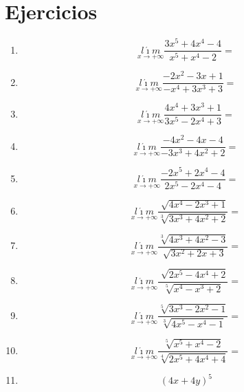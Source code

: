 \documentclass[oneside,spanish,letter]{article}
\begin{document}
\section{Ejercicios}
\begin{enumerate}
 \item $$\underset{x\rightarrow +\infty}{l\acute{\imath}m} \frac{3x^5+4x^4-4}{x^5+x^4-2}=$$
 \item $$\underset{x\rightarrow +\infty}{l\acute{\imath}m} \frac{-2x^2-3x+1}{-x^4+3x^3+3}=$$
 \item $$\underset{x\rightarrow +\infty}{l\acute{\imath}m} \frac{4x^4+3x^3+1}{3x^5-2x^4+3}=$$
 \item $$\underset{x\rightarrow +\infty}{l\acute{\imath}m} \frac{-4x^2-4x-4}{-3x^3+4x^2+2}=$$
 \item $$\underset{x\rightarrow +\infty}{l\acute{\imath}m} \frac{-2x^5+2x^4-4}{2x^5-2x^4-4}=$$
 \item $$\underset{x\rightarrow +\infty}{l\acute{\imath}m} \frac{\sqrt[]{4x^4-2x^3+1}}{\sqrt[3]{3x^3+4x^2+2}}=$$
 \item $$\underset{x\rightarrow +\infty}{l\acute{\imath}m} \frac{\sqrt[3]{4x^3+4x^2-3}}{\sqrt[]{3x^2+2x+3}}=$$
 \item $$\underset{x\rightarrow +\infty}{l\acute{\imath}m} \frac{\sqrt[]{2x^5-4x^4+2}}{\sqrt[5]{x^4-x^3+2}}=$$
 \item $$\underset{x\rightarrow +\infty}{l\acute{\imath}m} \frac{\sqrt[5]{3x^3-2x^2-1}}{\sqrt[3]{4x^5-x^4-1}}=$$
 \item $$\underset{x\rightarrow +\infty}{l\acute{\imath}m} \frac{\sqrt[5]{x^5+x^4-2}}{\sqrt[4]{2x^5+4x^4+4}}=$$
\item $$(4x+4y)^5$$
 \end{enumerate}
  \newpage
\end{document}
